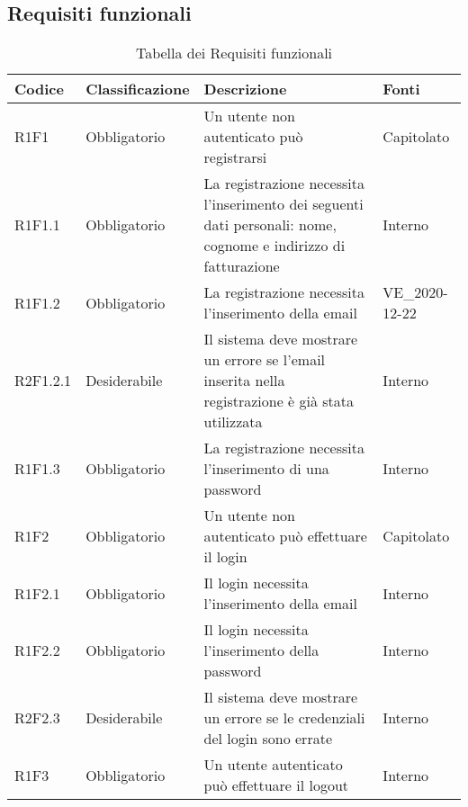 \subsection{Requisiti funzionali} 


{


\centering
\renewcommand{\arraystretch}{2}
\begin{longtable}{C{2.5cm} C{2.8cm} C{6.7cm} C{2.5cm}}
\caption{Tabella dei Requisiti funzionali}\\
\textbf{Codice} &
\textbf{Classificazione}&
\textbf{Descrizione}&
\textbf{Fonti}\\
\endhead


R1F1 & Obbligatorio & Un utente non autenticato può registrarsi & Capitolato \\
R1F1.1 & Obbligatorio & La registrazione necessita l'inserimento dei seguenti dati personali: nome, cognome e indirizzo di fatturazione & Interno \\
R1F1.2 & Obbligatorio & La registrazione necessita l'inserimento della email & VE\_2020-12-22 \\
R2F1.2.1 & Desiderabile & Il sistema deve mostrare un errore se l'email inserita nella registrazione è già stata utilizzata & Interno \\
R1F1.3 & Obbligatorio & La registrazione necessita l'inserimento di una password & Interno \\


R1F2 & Obbligatorio & Un utente non autenticato può effettuare il login & Capitolato \\
R1F2.1 & Obbligatorio & Il login necessita l'inserimento della email & Interno \\
R1F2.2 & Obbligatorio & Il login necessita l'inserimento della password & Interno \\
R2F2.3 & Desiderabile & Il sistema deve mostrare un errore se le credenziali del login sono errate & Interno \\


R1F3 & Obbligatorio & Un utente autenticato può effettuare il logout & Interno \\



\end{longtable}}
